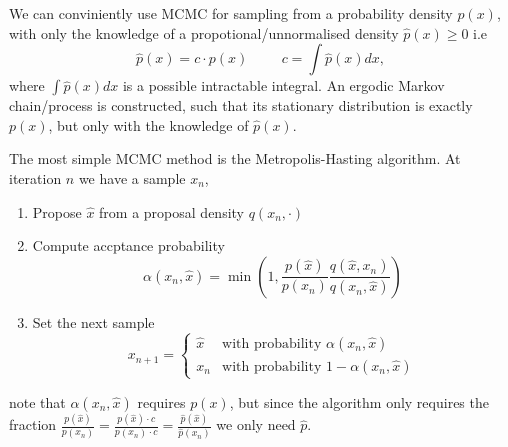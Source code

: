 \begin{testexample2}
    We can conviniently use MCMC for sampling from a probability density $p(x)$, with only the knowledge of a 
    propotional/unnormalised density $\hat p(x) \geq 0$ i.e
    $$\hat p(x) = c\cdot p(x) \hspace{1cm} c = \int \hat p(x) dx,$$
    where $\int \hat p(x) dx$ is a possible intractable integral. 
    An ergodic Markov chain/process is constructed, such that its stationary distribution is exactly $p(x)$, but only
    with the knowledge of $\hat p(x)$. 
\end{testexample2}

\begin{testexample}
    The most simple MCMC method is the Metropolis-Hasting algorithm. At iteration
    $n$ we have a sample $x_n$,
    \begin{enumerate}
        \item Propose $\hat x$ from a proposal density $q(x_n,\cdot)$
        \item Compute accptance probability $$\alpha(x_n,\hat x) = \min \left(1, \frac{p(\hat x)}{p(x_n)} \frac{q(\hat x, x_n)}{q(x_n,\hat x)}\right)$$
        \item Set the next sample $$x_{n+1} = \begin{cases}
            \hat x &\text{with probability } \alpha(x_n, \hat x)\\
             x_n &\text{with probability } 1-\alpha(x_n, \hat x)
        \end{cases}$$
    \end{enumerate}
    note that $\alpha(x_n,\hat x)$ requires $p(x)$, but since the algorithm only
    requires the fraction $\frac{p(\hat x)}{p(x_n)} = \frac{p(\hat x)\cdot c}{p(x_n)\cdot c} = \frac{\hat p(\hat x)}{\hat p(x_n)}$
    we only need $\hat p$. 
    

\end{testexample}
